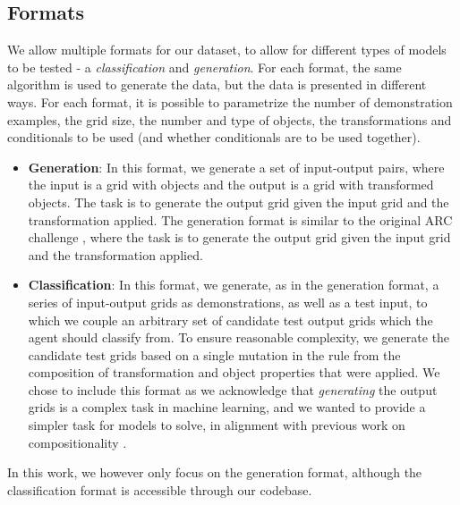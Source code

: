 \subsection{Formats}\label{formats}

We allow multiple formats for our dataset, to allow for different types of models to be tested - a \textit{classification} and \textit{generation}. For each format, the same algorithm is used to generate the data, but the data is presented in different ways. For each format, it is possible to parametrize the number of demonstration examples, the grid size, the number and type of objects, the transformations and conditionals to be used (and whether conditionals are to be used together).  

\begin{itemize}
    \item \textbf{Generation}: In this format, we generate a set of input-output pairs, where the input is a grid with objects and the output is a grid with transformed objects. The task is to generate the output grid given the input grid and the transformation applied. The generation format is similar to the original ARC challenge \cite{cholletARC}, where the task is to generate the output grid given the input grid and the transformation applied.
    \item \textbf{Classification}: In this format, we generate, as in the generation format, a series of input-output grids as demonstrations, as well as a test input, to which we couple an arbitrary set of candidate test output grids which the agent should classify from. To ensure reasonable complexity, we generate the candidate test grids based on a single mutation in the rule from the composition of transformation and object properties that were applied. We chose to include this format as we acknowledge that \textit{generating} the output grids is a complex task in machine learning, and we wanted to provide a simpler task for models to solve, in alignment with previous work on compositionality \cite{cvr2022}. 
\end{itemize}

In this work, we however only focus on the generation format, although the classification format is accessible through our codebase. 